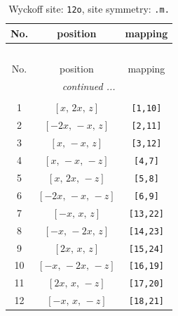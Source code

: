 \documentclass[fleqn,8pt]{jsarticle}
\begin{document}
\begin{longtable}{ccc}
\caption{Wyckoff site: {\tt 12o}, site symmetry: {\tt .m.}}
 \\
 \hline \hline
No. & position & mapping \\ \hline \endfirsthead

\multicolumn{2}{l}{\tablename\ \thetable{}} \\
 \hline \hline
No. & position & mapping \\ \hline \endhead

 \hline \hline
\multicolumn{2}{r}{\footnotesize\it continued ...} \\ \endfoot

 \hline \hline
\multicolumn{2}{r}{} \\ \endlastfoot

1 & $\left[ x,\, 2 x,\, z \right]$ & {\tt [1,10]} \\ \hline
2 & $\left[ - 2 x,\, - x,\, z \right]$ & {\tt [2,11]} \\ \hline
3 & $\left[ x,\, - x,\, z \right]$ & {\tt [3,12]} \\ \hline
4 & $\left[ x,\, - x,\, - z \right]$ & {\tt [4,7]} \\ \hline
5 & $\left[ x,\, 2 x,\, - z \right]$ & {\tt [5,8]} \\ \hline
6 & $\left[ - 2 x,\, - x,\, - z \right]$ & {\tt [6,9]} \\ \hline
7 & $\left[ - x,\, x,\, z \right]$ & {\tt [13,22]} \\ \hline
8 & $\left[ - x,\, - 2 x,\, z \right]$ & {\tt [14,23]} \\ \hline
9 & $\left[ 2 x,\, x,\, z \right]$ & {\tt [15,24]} \\ \hline
10 & $\left[ - x,\, - 2 x,\, - z \right]$ & {\tt [16,19]} \\ \hline
11 & $\left[ 2 x,\, x,\, - z \right]$ & {\tt [17,20]} \\ \hline
12 & $\left[ - x,\, x,\, - z \right]$ & {\tt [18,21]} \\
\end{longtable}
\renewcommand{\arraystretch}{1.2}
\end{document}
